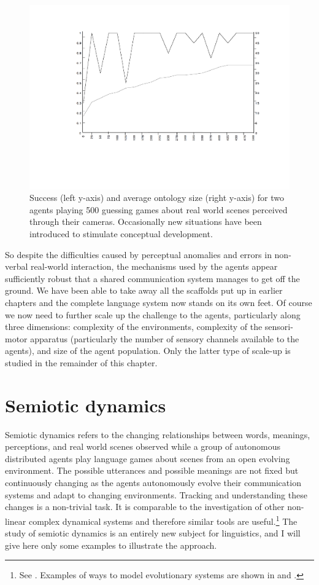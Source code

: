 \begin{figure}[htbp]
  \centerline{\includegraphics[width=.70\textwidth]{chap7/figs/psucc500.pdf}}
\caption{\label{psuccess1}Success 
(left y-axis) and average ontology size
(right y-axis) for two agents playing 500
guessing games about real world scenes perceived
through their cameras. Occasionally new situations
have been introduced to stimulate conceptual development.} 
\end{figure}

So despite the difficulties caused by perceptual anomalies
and errors in non-verbal real-world interaction, the 
mechanisms used by the agents appear sufficiently 
robust that a shared communication system manages to get 
off the ground. We have been able to 
take away all the scaffolds put up in earlier
chapters and the complete language system now stands on its own
feet. Of course we now need to further scale up the 
challenge to the agents, particularly along three
dimensions: complexity of the environments, complexity 
of the sensori-motor apparatus (particularly the number of
sensory channels available to the agents), and
size of the agent population. Only the latter type of 
scale-up is studied in the remainder of this chapter. 

\section{Semiotic dynamics} 

Semiotic dynamics refers to the changing relationships
between words, meanings, perceptions,
and real world scenes observed while a group of
autonomous distributed agents play language games
about scenes from an open evolving environment. 
The possible utterances and
possible meanings are not fixed but continuously
changing as the agents autonomously evolve their
communication systems and adapt to changing
environments. Tracking and understanding these
changes is a non-trivial task. It is comparable to 
the investigation of other non-linear complex dynamical
systems and therefore similar tools are useful.\footnote{
See \cite{Badii:1997}. 
Examples of ways to model evolutionary systems are shown in 
\cite{Kauffman:1993} and \cite{Maynard:1989}.}
The study of semiotic dynamics is an entirely new subject
for linguistics, and I will give here only some
examples to illustrate the approach. 


